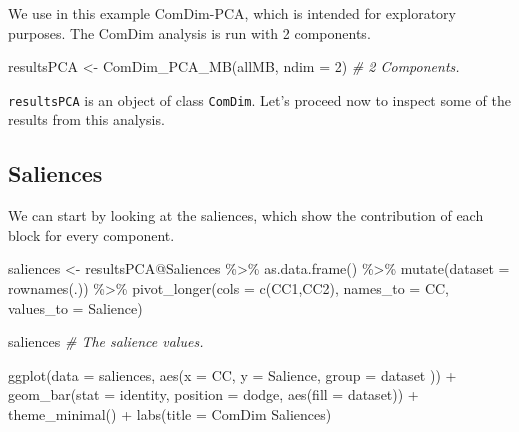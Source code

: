 \documentclass[
]{book}
\newenvironment{Shaded}{\begin{snugshade}}{\end{snugshade}}
\newcommand{\AttributeTok}[1]{\textcolor[rgb]{0.77,0.63,0.00}{#1}}
\newcommand{\CommentTok}[1]{\textcolor[rgb]{0.56,0.35,0.01}{\textit{#1}}}
\newcommand{\DecValTok}[1]{\textcolor[rgb]{0.00,0.00,0.81}{#1}}
\newcommand{\FunctionTok}[1]{\textcolor[rgb]{0.00,0.00,0.00}{#1}}
\newcommand{\NormalTok}[1]{#1}
\newcommand{\OtherTok}[1]{\textcolor[rgb]{0.56,0.35,0.01}{#1}}
\newcommand{\SpecialCharTok}[1]{\textcolor[rgb]{0.00,0.00,0.00}{#1}}
\newcommand{\StringTok}[1]{\textcolor[rgb]{0.31,0.60,0.02}{#1}}
\begin{document}
We use in this example ComDim-PCA, which is intended for exploratory purposes.
The ComDim analysis is run with 2 components.

\begin{Shaded}
\begin{Highlighting}[]
\NormalTok{resultsPCA }\OtherTok{\textless{}{-}} \FunctionTok{ComDim\_PCA\_MB}\NormalTok{(allMB, }\AttributeTok{ndim =} \DecValTok{2}\NormalTok{) }\CommentTok{\# 2 Components.}
\end{Highlighting}
\end{Shaded}

\texttt{resultsPCA} is an object of class \texttt{ComDim}.
Let's proceed now to inspect some of the results from this analysis.

\hypertarget{Saliences}{%
\subsection{Saliences}\label{Saliences}}

We can start by looking at the saliences, which show the contribution of each
block for every component.

\begin{Shaded}
\begin{Highlighting}[]
\NormalTok{saliences }\OtherTok{\textless{}{-}}\NormalTok{ resultsPCA}\SpecialCharTok{@}\NormalTok{Saliences }\SpecialCharTok{\%\textgreater{}\%}
  \FunctionTok{as.data.frame}\NormalTok{() }\SpecialCharTok{\%\textgreater{}\%}
  \FunctionTok{mutate}\NormalTok{(}\AttributeTok{dataset =} \FunctionTok{rownames}\NormalTok{(.)) }\SpecialCharTok{\%\textgreater{}\%}
  \FunctionTok{pivot\_longer}\NormalTok{(}\AttributeTok{cols =} \FunctionTok{c}\NormalTok{(}\StringTok{\textquotesingle{}CC1\textquotesingle{}}\NormalTok{,}\StringTok{\textquotesingle{}CC2\textquotesingle{}}\NormalTok{),}
               \AttributeTok{names\_to =} \StringTok{\textquotesingle{}CC\textquotesingle{}}\NormalTok{,}
               \AttributeTok{values\_to =} \StringTok{\textquotesingle{}Salience\textquotesingle{}}\NormalTok{)}

\NormalTok{saliences }\CommentTok{\# The salience values.}

\FunctionTok{ggplot}\NormalTok{(}\AttributeTok{data =}\NormalTok{ saliences,}
       \FunctionTok{aes}\NormalTok{(}\AttributeTok{x =}\NormalTok{ CC, }\AttributeTok{y =}\NormalTok{ Salience, }\AttributeTok{group =}\NormalTok{ dataset )) }\SpecialCharTok{+}
  \FunctionTok{geom\_bar}\NormalTok{(}\AttributeTok{stat =} \StringTok{\textquotesingle{}identity\textquotesingle{}}\NormalTok{, }\AttributeTok{position =} \StringTok{\textquotesingle{}dodge\textquotesingle{}}\NormalTok{,}
           \FunctionTok{aes}\NormalTok{(}\AttributeTok{fill =}\NormalTok{ dataset)) }\SpecialCharTok{+}
  \FunctionTok{theme\_minimal}\NormalTok{() }\SpecialCharTok{+}
  \FunctionTok{labs}\NormalTok{(}\AttributeTok{title =} \StringTok{\textquotesingle{}ComDim Saliences\textquotesingle{}}\NormalTok{)}
\end{Highlighting}
\end{Shaded}
\end{document}
